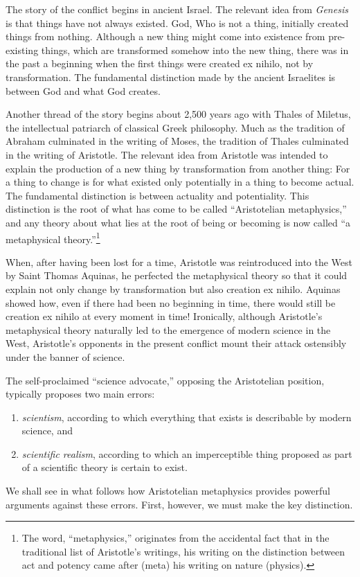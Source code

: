 \documentclass{article}
\begin{document}
The story of the conflict begins in ancient Israel.  The relevant idea from
{\it Genesis} is that things have not always existed.  God, Who is not a thing,
initially created things from nothing.  Although a new thing might come into
existence from pre-existing things, which are transformed somehow into the new
thing, there was in the past a beginning when the first things were created ex
nihilo, not by transformation.  The fundamental distinction made by the ancient
Israelites is between God and what God creates.

Another thread of the story begins about 2,500 years ago with Thales of
Miletus, the intellectual patriarch of classical Greek philosophy.  Much as the
tradition of Abraham culminated in the writing of Moses, the tradition of
Thales culminated in the writing of Aristotle.  The relevant idea from
Aristotle was intended to explain the production of a new thing by
transformation from another thing: For a thing to change is for what existed
only potentially in a thing to become actual.  The fundamental distinction is
between actuality and potentiality.  This distinction is the root of what has
come to be called ``Aristotelian metaphysics,'' and any theory about what lies
at the root of being or becoming is now called ``a metaphysical
theory.''\footnote{%
   The word, ``metaphysics,'' originates from the accidental fact that in the
   traditional list of Aristotle's writings, his writing on the distinction
   between act and potency came after (meta) his writing on nature (physics).%
}

When, after having been lost for a time, Aristotle was reintroduced into the
West by Saint Thomas Aquinas, he perfected the metaphysical theory so that it
could explain not only change by transformation but also creation ex nihilo.
Aquinas showed how, even if there had been no beginning in time, there would
still be creation ex nihilo at every moment in time!  Ironically, although
Aristotle's metaphysical theory naturally led to the emergence of modern
science in the West, Aristotle's opponents in the present conflict mount their
attack ostensibly under the banner of science.

The self-proclaimed ``science advocate,'' opposing the Aristotelian position,
typically proposes two main errors:
\begin{enumerate}
   \item \emph{scientism}, according to which everything that exists is
      describable by modern science, and
   \item \emph{scientific realism}, according to which an imperceptible thing
      proposed as part of a scientific theory is certain to exist.
\end{enumerate}
We shall see in what follows how Aristotelian metaphysics provides powerful
arguments against these errors.  First, however, we must make the key
distinction.
\end{document}
